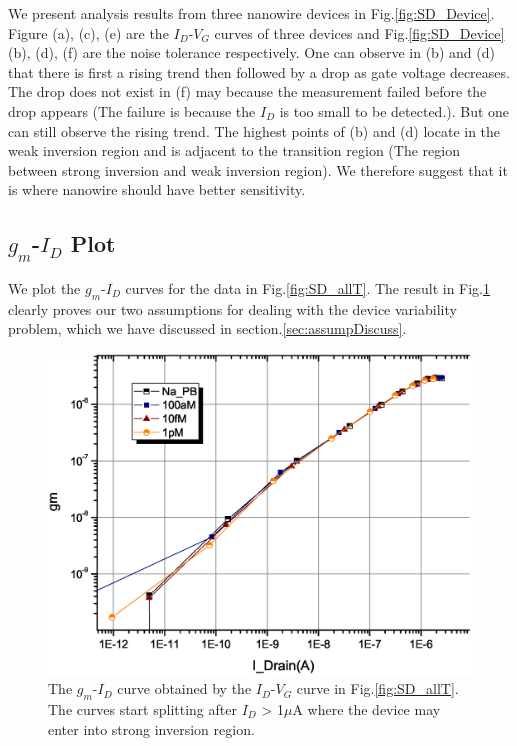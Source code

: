We present analysis results from three nanowire devices in Fig.\ref{fig:SD_Device}.
Figure (a), (c), (e) are the $I_D$-$V_G$ curves of three devices and Fig.\ref{fig:SD_Device}(b), (d), (f) are the noise tolerance respectively.
One can observe in (b) and (d) that there is first a rising trend then followed by a drop as gate voltage decreases.
The drop does not exist in (f) may because the measurement failed before the drop appears (The failure is because the $I_D$ is too small to be detected.).
But one can still observe the rising trend.
The highest points of (b) and (d) locate in the weak inversion region and is adjacent to the transition region (The region between strong inversion and weak inversion region).
We therefore suggest that it is where nanowire should have better sensitivity.

\subsection{$g_m$-$I_D$ Plot} \label{section:disparityBio}
We plot the $g_m$-$I_D$ curves for the data in Fig.\ref{fig:SD_allT}.
The result in Fig.\ref{fig:gmId} clearly proves our two assumptions for dealing with the device variability problem, which we have discussed in section.\ref{sec:assumpDiscuss}.

\begin{figure}[htb]
    \includegraphics[width=1\textwidth]{images/chapter3/Id_Dev_bio.eps}
    \caption{The $g_m$-$I_D$ curve obtained by the $I_D$-$V_G$ curve in Fig.\ref{fig:SD_allT}. The curves start splitting after $I_D$ > 1$\mu$A where the device may enter into strong inversion region.}
    \label{fig:gmId}
\end{figure}

